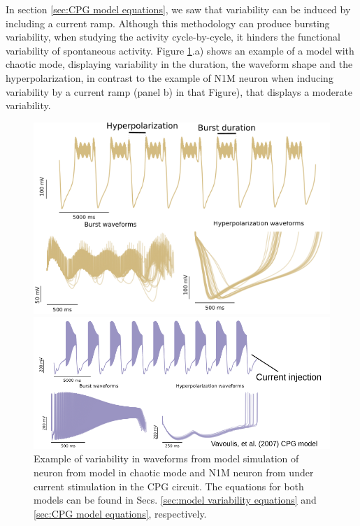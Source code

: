 In section \ref{sec:CPG model equations}, we saw that variability can be induced by including a current ramp.  Although this methodology can produce bursting variability, when studying the activity cycle-by-cycle, it hinders the functional variability of spontaneous activity. Figure \ref{fig:model burst variability}.a) shows an example of a model with chaotic mode, displaying variability in the duration, the waveform shape and the hyperpolarization, in contrast to the example of N1M neuron when inducing variability by a current ramp (panel b) in that Figure), that displays a moderate variability. 

\begin{figure}[hbt]
	\centering
	\begin{minipage}{0.48\textwidth}
		\includegraphics[width=\textwidth]{img/invariants/variability/TN-burst_variability.png}
	\end{minipage}
	\begin{minipage}{0.48\textwidth}
		\includegraphics[width=\textwidth]{img/invariants/variability/n1m_vav_burst_variability.png}
	\end{minipage}
	\caption{Example of variability in waveforms from model simulation of neuron from \textcite{nowotny_probing_2008} model in chaotic mode and N1M neuron from \textcite{vavoulis_dynamic_2007} under current stimulation in the CPG circuit. The equations for both models can be found in Secs. \ref{sec:model variability equations} and \ref{sec:CPG model equations}, respectively.}
	\label{fig:model burst variability}
\end{figure}


